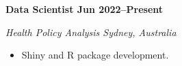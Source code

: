 \textbf{Data Scientist \hfill Jun 2022--Present}\par
\textit{Health Policy Analysis \hfill Sydney, Australia}\par
\begin{itemize}
	\item Shiny and R package development.
\end{itemize}\par
